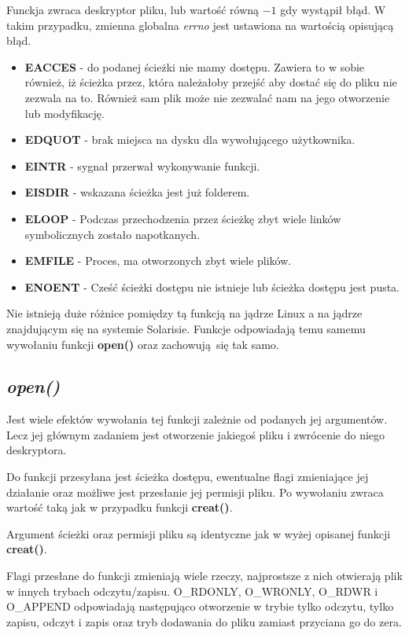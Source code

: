 \documentclass{article}
\begin{document}
Funckja zwraca deskryptor pliku, lub wartość równą $-1$ gdy wystąpił błąd.
W takim przypadku, zmienna globalna \textit{errno} jest ustawiona na wartością opisującą błąd.
\begin{itemize}
\item \textbf{EACCES} - do podanej ścieżki nie mamy dostępu. Zawiera to w sobie również,
iż ścieżka przez, która należałoby przejść aby dostać się do pliku nie zezwala na to.
Również sam plik może nie zezwalać nam na jego otworzenie lub modyfikację.
\item \textbf{EDQUOT} - brak miejsca na dysku dla wywołującego użytkownika.
\item \textbf{EINTR} - sygnał przerwał wykonywanie funkcji.
\item \textbf{EISDIR} - wskazana ścieżka jest już folderem.
\item \textbf{ELOOP} - Podczas przechodzenia przez ścieżkę zbyt wiele linków symbolicznych zostało napotkanych.
\item \textbf{EMFILE} - Proces, ma otworzonych zbyt wiele plików.
\item \textbf{ENOENT} - Cześć ścieżki dostępu nie istnieje lub ścieżka dostępu jest pusta.
\end{itemize}

Nie istnieją duże różnice pomiędzy tą funkcją na jądrze Linux a na jądrze znajdującym się na systemie Solarisie.
Funkcje odpowiadają temu samemu wywołaniu funkcji \textbf{open()} oraz zachowują się tak samo.

\subsection{\textit{open()}}
Jest wiele efektów wywołania tej funkcji zależnie od podanych jej argumentów.
Lecz jej głównym zadaniem jest otworzenie jakiegoś pliku i zwrócenie do niego deskryptora.

Do funkcji przesyłana jest ścieżka dostępu, ewentualne flagi zmieniające jej działanie oraz możliwe jest przesłanie jej permisji pliku.
Po wywołaniu zwraca wartość taką jak w przypadku funkcji \textbf{creat()}.

Argument ścieżki oraz permisji pliku są identyczne jak w wyżej opisanej funkcji \textbf{creat()}.

Flagi przesłane do funkcji zmieniają wiele rzeczy, najprostsze z nich otwierają plik w innych trybach odczytu/zapisu.
O\_RDONLY, O\_WRONLY, O\_RDWR i O\_APPEND odpowiadają następująco otworzenie w trybie tylko odczytu, tylko zapisu, odczyt i zapis oraz tryb dodawania do pliku zamiast przyciana go do zera.
\end{document}
